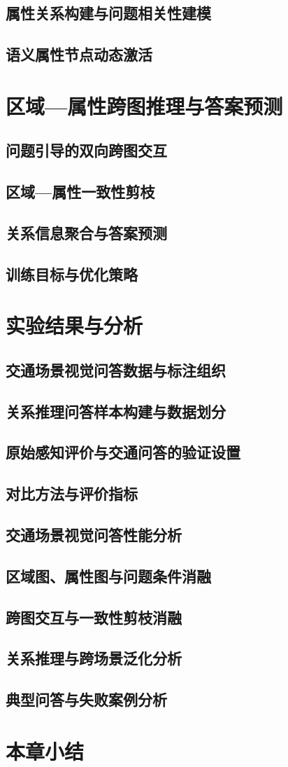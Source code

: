\subsection{属性关系构建与问题相关性建模}
\subsection{语义属性节点动态激活}

\section{区域—属性跨图推理与答案预测}
\subsection{问题引导的双向跨图交互}
\subsection{区域—属性一致性剪枝}
\subsection{关系信息聚合与答案预测}
\subsection{训练目标与优化策略}

\section{实验结果与分析}
\subsection{交通场景视觉问答数据与标注组织}
\subsection{关系推理问答样本构建与数据划分}
\subsection{原始感知评价与交通问答的验证设置}
\subsection{对比方法与评价指标}
\subsection{交通场景视觉问答性能分析}
\subsection{区域图、属性图与问题条件消融}
\subsection{跨图交互与一致性剪枝消融}
\subsection{关系推理与跨场景泛化分析}
\subsection{典型问答与失败案例分析}

\section{本章小结}
